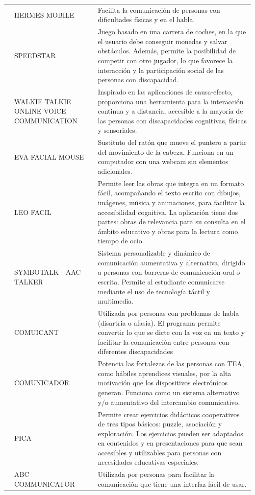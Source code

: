 \documentclass[spanish]{textolivre}
\begin{document}
\begin{small}
\begin{longtable}{
    p{}
    p{}    
    p{}    }
 & HERMES MOBILE & Facilita la comunicación de personas con dificultades físicas y en el habla. \\
 & SPEEDSTAR & Juego basado en una carrera de coches, en la que el usuario debe conseguir monedas y salvar obstáculos. Además, permite la posibilidad de competir con otro jugador, lo que favorece la interacción y la participación social de las personas con discapacidad. \\
 & WALKIE TALKIE ONLINE VOICE COMMUNICATION & Inspirado en las aplicaciones de causa-efecto, proporciona una herramienta para la interacción continua y a distancia, accesible a la mayoría de las personas con discapacidades cognitivas, físicas y sensoriales. \\
 & EVA FACIAL MOUSE & Sustituto del ratón que mueve el puntero a partir del movimiento de la cabeza. Funciona en un computador con una webcam sin elementos adicionales. \\
 & LEO FACIL & Permite leer las obras que integra en un formato fácil, acompañando el texto escrito con dibujos, imágenes, música y animaciones, para facilitar la accesibilidad cognitiva. La aplicación tiene dos partes: obras de relevancia para su consulta en el ámbito educativo y obras para la lectura como tiempo de ocio. \\
 & SYMBOTALK - AAC TALKER & Sistema personalizable y dinámico de comunicación aumentativa y alternativa, dirigido a personas con barreras de comunicación oral o escrita. Permite al estudiante comunicarse mediante el uso de tecnología táctil y multimedia. \\
 & COMUICANT & Utilizada por personas con problemas de habla (disartria o afasia). El programa permite convertir lo que se dicte con la voz en un texto y facilitar la comunicación entre personas con diferentes discapacidades \\
 & COMUNICADOR & Potencia las fortalezas de las personas con TEA, como hábiles aprendices visuales, por la alta motivación que los dispositivos electrónicos generan.
 Funciona como un sistema alternativo y/o aumentativo del intercambio comunicativo. \\
 & PICA & Permite crear ejercicios didácticos cooperativos de tres tipos básicos: puzzle, asociación y exploración. Los ejercicios pueden ser adaptados en contenidos y en presentaciones para que sean accesibles y utilizables para personas con necesidades educativas especiales. \\
 & ABC COMMUNICATOR & Utilizada por personas para facilitar la comunicación que tiene una interfaz fácil de usar. \\

\end{longtable}
\end{small}
\end{document}

